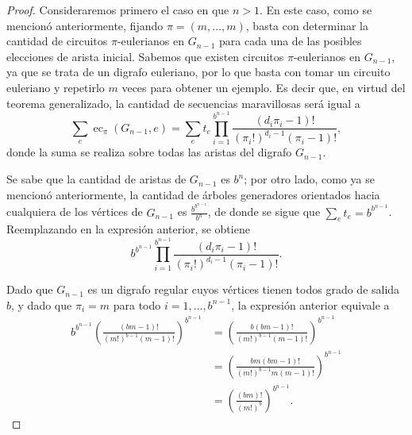 \begin{proof}
	Consideraremos primero el caso en que $n > 1$.
	En este caso, como se mencionó anteriormente, fijando $\pi = (m, \dots, m)$,
	basta con determinar la cantidad de circuitos $\pi$-eulerianos en $G_{n-1}$
	para cada una de las posibles elecciones de arista inicial.
	Sabemos que existen circuitos $\pi$-eulerianos en $G_{n-1}$, ya que se trata
	de un digrafo euleriano, por lo que basta con tomar un circuito euleriano y
	repetirlo $m$ veces para obtener un ejemplo.
	Es decir que, en virtud del teorema \BEST{} generalizado, la cantidad de
	secuencias maravillosas será igual a \[ \sum_e \operatorname{ec}_\pi(G_{n-1}, e) =
		\sum_e t_e \prod_{i=1}^{b^{n-1}} \frac{(d_i\pi_i - 1)!
		}{(\pi_i!)^{d_i-1}(\pi_i-1)!}, \] donde la suma se realiza sobre todas las
	aristas del digrafo $G_{n-1}$.

	Se sabe que la cantidad de aristas de $G_{n-1}$ es $b^n$; por otro lado,
	como ya se mencionó anteriormente, la
	cantidad de árboles generadores orientados hacia cualquiera de los vértices
	de $G_{n-1}$ es $\frac{b^{b^{n-1}}}{b^n}$, de donde se sigue que
	$\sum_{e} t_e = b^{b^{n-1}}$.
	Reemplazando en la expresión anterior, se obtiene \[ b^{b^{n-1}}
		\prod_{i=1}^{b^{n-1}} \frac{(d_i\pi_i - 1)! }{(\pi_i!)^{d_i-1}(\pi_i-1)!}.
	\]

	Dado que $G_{n-1}$ es un digrafo regular cuyos vértices tienen todos grado de
	salida $b$, y dado que $\pi_i = m$ para todo $i = 1, \dots, b^{n-1}$, la
	expresión anterior equivale a
	\begin{align*}
		b^{b^{n-1}} \left( \frac{(bm - 1)! }{(m!)^{b-1}(m-1)!} \right)^{b^{n-1}}
			&= \left( \frac{b (bm - 1)! }{(m!)^{b-1}(m-1)!} \right)^{b^{n-1}} \\
			&= \left( \frac{bm (bm - 1)! }{(m!)^{b-1}m(m-1)!} \right)^{b^{n-1}} \\
			&= \left( \frac{(bm)! }{(m!)^b} \right)^{b^{n-1}}.
	\end{align*}


\end{proof}

